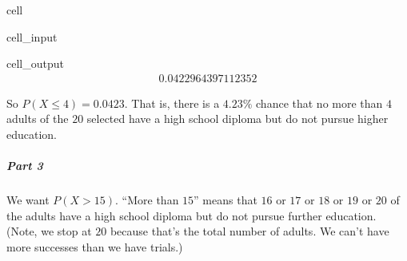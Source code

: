\documentclass[letterpaper,10pt,english]{jupyterBook}
\begin{document}
\begin{sphinxuseclass}{cell}\begin{sphinxVerbatimInput}

\begin{sphinxuseclass}{cell_input}
\begin{sphinxVerbatim}[commandchars=\\\{\}]
\end{sphinxVerbatim}

\end{sphinxuseclass}\end{sphinxVerbatimInput}
\begin{sphinxVerbatimOutput}

\begin{sphinxuseclass}{cell_output}\begin{equation*}
\begin{split}0.0422964397112352\end{split}
\end{equation*}
\end{sphinxuseclass}\end{sphinxVerbatimOutput}

\end{sphinxuseclass}
\sphinxAtStartPar
So \(P(X \leq 4) = 0.0423\). That is, there is a \(4.23\%\) chance that no more than \(4\) adults of the \(20\) selected have a high school diploma but do not pursue higher education.


\subparagraph{Part 3}
\label{\detokenize{Ch3 Probability/3.6 The Binomial Distribution:id6}}
\sphinxAtStartPar
We want \(P(X > 15)\). “More than \(15\)” means that \(16\) or \(17\) or \(18\) or \(19\) or \(20\) of the adults have a high school diploma but do not pursue further education. (Note, we stop at \(20\) because that’s the total number of adults. We can’t have more successes than we have trials.)
\end{document}
